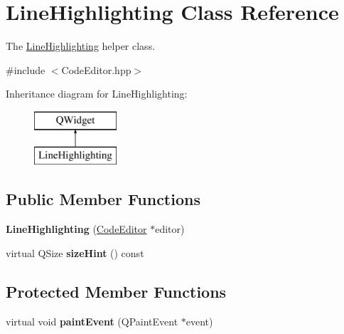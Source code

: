 \hypertarget{classLineHighlighting}{\section{Line\+Highlighting Class Reference}
\label{classLineHighlighting}
}


The \hyperlink{classLineHighlighting}{Line\+Highlighting} helper class.  




{\ttfamily \#include $<$Code\+Editor.\+hpp$>$}

Inheritance diagram for Line\+Highlighting\+:\begin{figure}[H]
\begin{center}
\leavevmode
\includegraphics[height=2.000000cm]{classLineHighlighting}
\end{center}
\end{figure}
\subsection*{Public Member Functions}
\begin{DoxyCompactItemize}
\item 
\hypertarget{classLineHighlighting_ae54cb1a71e7aff9e91fe41a642b674a6}{{\bfseries Line\+Highlighting} (\hyperlink{classCodeEditor}{Code\+Editor} $\ast$editor)}\label{classLineHighlighting_ae54cb1a71e7aff9e91fe41a642b674a6}

\item 
\hypertarget{classLineHighlighting_a125e4c4fb6f09b82ef1617ed9d6c936a}{virtual Q\+Size {\bfseries size\+Hint} () const }\label{classLineHighlighting_a125e4c4fb6f09b82ef1617ed9d6c936a}

\end{DoxyCompactItemize}
\subsection*{Protected Member Functions}
\begin{DoxyCompactItemize}
\item 
\hypertarget{classLineHighlighting_a14c16b62a7220a72288dc68b0b3ce42c}{virtual void {\bfseries paint\+Event} (Q\+Paint\+Event $\ast$event)}\label{classLineHighlighting_a14c16b62a7220a72288dc68b0b3ce42c}

\end{DoxyCompactItemize}


